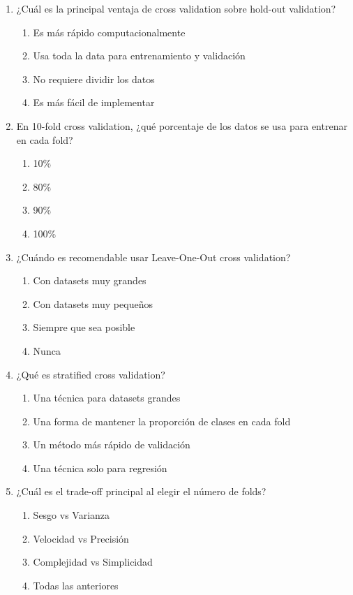 \documentclass[12pt]{article}
\begin{document}
\begin{enumerate}
    \item ¿Cuál es la principal ventaja de cross validation sobre hold-out validation?
    \begin{enumerate}
        \item Es más rápido computacionalmente
        \item Usa toda la data para entrenamiento y validación
        \item No requiere dividir los datos
        \item Es más fácil de implementar
    \end{enumerate}
    
    \item En 10-fold cross validation, ¿qué porcentaje de los datos se usa para entrenar en cada fold?
    \begin{enumerate}
        \item 10\%
        \item 80\%
        \item 90\%
        \item 100\%
    \end{enumerate}
    
    \item ¿Cuándo es recomendable usar Leave-One-Out cross validation?
    \begin{enumerate}
        \item Con datasets muy grandes
        \item Con datasets muy pequeños
        \item Siempre que sea posible
        \item Nunca
    \end{enumerate}
    
    \item ¿Qué es stratified cross validation?
    \begin{enumerate}
        \item Una técnica para datasets grandes
        \item Una forma de mantener la proporción de clases en cada fold
        \item Un método más rápido de validación
        \item Una técnica solo para regresión
    \end{enumerate}
    
    \item ¿Cuál es el trade-off principal al elegir el número de folds?
    \begin{enumerate}
        \item Sesgo vs Varianza
        \item Velocidad vs Precisión
        \item Complejidad vs Simplicidad
        \item Todas las anteriores
    \end{enumerate}
\end{enumerate}
\end{document}
